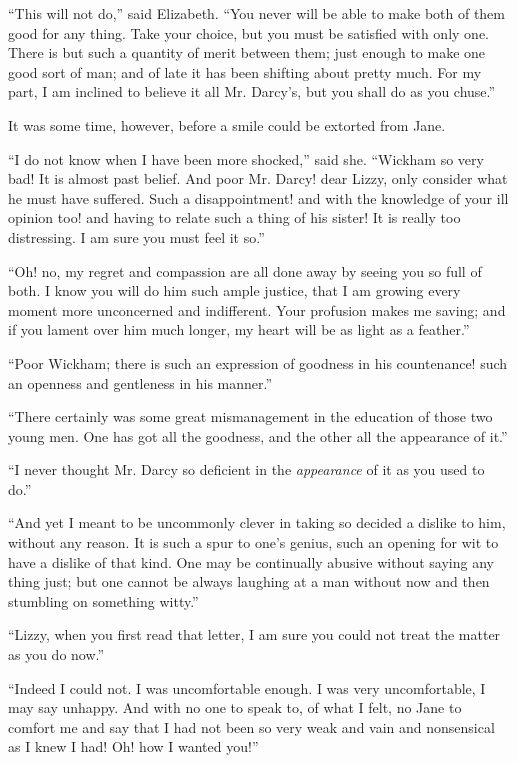 “This will not do,” said Elizabeth. “You never will
be able to make both of them good for any thing. Take
your choice, but you must be satisfied with only one.
There is but such a quantity of merit between them;
just enough to make one good sort of man; and of late
it has been shifting about pretty much. For my part,
I am inclined to believe it all Mr. Darcy’s, but you shall
do as you chuse.”

It was some time, however, before a smile could be
extorted from Jane.

“I do not know when I have been more shocked,”
said she. “Wickham so very bad! It is almost past
belief. And poor Mr. Darcy! dear Lizzy, only consider
what he must have suffered. Such a disappointment!
and with the knowledge of your ill opinion too! and having
to relate such a thing of his sister! It is really too
distressing. I am sure you must feel it so.”

“Oh! no, my regret and compassion are all done away
by seeing you so full of both. I know you will do him
such ample justice, that I am growing every moment
more unconcerned and indifferent. Your profusion makes
me saving; and if you lament over him much longer,
my heart will be as light as a feather.”

“Poor Wickham; there is such an expression of goodness
in his countenance! such an openness and gentleness
in his manner.”

“There certainly was some great mismanagement in
the education of those two young men. One has got all
the goodness, and the other all the appearance of it.”

“I never thought Mr. Darcy so deficient in the \textit{appearance}
of it as you used to do.”

“And yet I meant to be uncommonly clever in taking
so decided a dislike to him, without any reason. It is
such a spur to one’s genius, such an opening for wit to
have a dislike of that kind. One may be continually
abusive without saying any thing just; but one cannot
be always laughing at a man without now and then
stumbling on something witty.”

“Lizzy, when you first read that letter, I am sure you
could not treat the matter as you do now.”

“Indeed I could not. I was uncomfortable en\-ough.
I was very uncomfortable, I may say unhappy. And with
no one to speak to, of what I felt, no Jane to comfort
me and say that I had not been so very weak and vain
and nonsensical as I knew I had! Oh! how I wanted you!”

